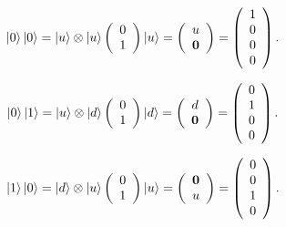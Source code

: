 \begin{equation}
\label{50}
\ket{0} \ket{0} =  \ket{u} \otimes \ket{u}
\left( \begin{array}{ccc}
 0  \\
 1 
\end{array} \right) 
\ket{u}
=
\left( \begin{array}{ccc}
 u  \\
 \mathbf{0} 
\end{array} \right) 
=
\left( \begin{array}{ccc}
 1  \\
 0  \\
 0  \\
 0
\end{array} \right) .
\end{equation}


\begin{equation}
\label{51}
\ket{0} \ket{1} =  \ket{u} \otimes \ket{d}
\left( \begin{array}{ccc}
 0  \\
 1 
\end{array} \right) 
\ket{d}
=
\left( \begin{array}{ccc}
 d  \\
 \mathbf{0} 
\end{array} \right) 
=
\left( \begin{array}{ccc}
 0  \\
 1  \\
 0  \\
 0
\end{array} \right) .
\end{equation}


\begin{equation}
\label{52}
\ket{1} \ket{0} =  \ket{d} \otimes \ket{u}
\left( \begin{array}{ccc}
 0  \\
 1 
\end{array} \right) 
\ket{u}
=
\left( \begin{array}{ccc}
 \mathbf{0}  \\
 u
\end{array} \right) 
=
\left( \begin{array}{ccc}
 0  \\
 0  \\
 1  \\
 0
\end{array} \right) .
\end{equation}

